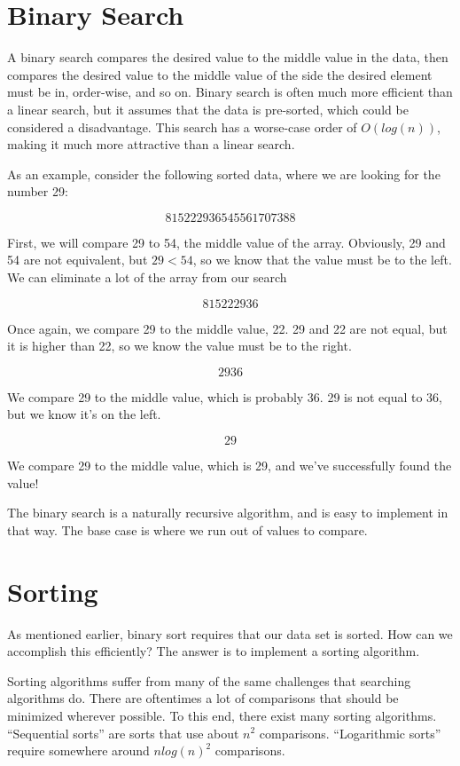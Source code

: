 \documentclass{article}
\begin{document}
\section{Binary Search}
A binary search compares the desired value to the middle value in the data,
then compares the desired value to the middle value of the side the desired
element must be in, order-wise, and so on. Binary search is often much more
efficient than a linear search, but it assumes that the data is pre-sorted,
which could be considered a disadvantage. This search has a worse-case order of
$O(log(n))$, making it much more attractive than a linear search.

As an example, consider the following sorted data, where we are looking for the
number 29:

$$8 15 22 29 36 54 55 61 70 73 88$$

First, we will compare 29 to 54, the middle value of the array. Obviously, 29
and 54 are not equivalent, but $29<54$, so we know that the value must be to
the left. We can eliminate a lot of the array from our search

$$8 15 22 29 36$$

Once again, we compare 29 to the middle value, 22. 29 and 22 are not equal, but
it is higher than 22, so we know the value must be to the right.

$$29 36$$

We compare 29 to the middle value, which is probably 36. 29 is not equal to 36,
but we know it's on the left.

$$29$$

We compare 29 to the middle value, which is 29, and we've successfully found
the value!

The binary search is a naturally recursive algorithm, and is easy to implement
in that way. The base case is where we run out of values to compare.

\section{Sorting}
As mentioned earlier, binary sort requires that our data set is sorted. How can
we accomplish this efficiently? The answer is to implement a sorting algorithm.

Sorting algorithms suffer from many of the same challenges that searching
algorithms do. There are oftentimes a lot of comparisons that should be
minimized wherever possible. To this end, there exist many sorting algorithms.
``Sequential sorts'' are sorts that use about $n^2$ comparisons. ``Logarithmic
sorts'' require somewhere around $nlog(n)^2$ comparisons.
\end{document}
